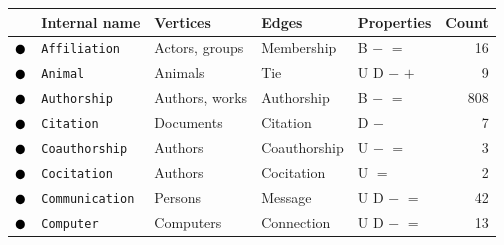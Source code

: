 \begin{tabular}{lllllr}
\toprule
& \textbf{Internal name} & \textbf{Vertices} & \textbf{Edges} & \textbf{Properties} & \textbf{Count} \\
\midrule
\textcolor{colorAffiliation}{$\newmoon$} &\texttt{Affiliation} & Actors, groups & Membership & \phantom{U} \phantom{D} B $-$ $=$ \phantom{$+$} \phantom{$\pm$} \phantom{$\stackrel{+}{=}$} \phantom{$*$} \phantom{$_*{}^*$} \phantom{$\rightleftharpoons$} \phantom{$++$}  &  16\\
\textcolor{colorAnimal}{$\newmoon$} &\texttt{Animal} & Animals & Tie & U D \phantom{B} $-$ \phantom{$=$} $+$ \phantom{$\pm$} \phantom{$\stackrel{+}{=}$} \phantom{$*$} \phantom{$_*{}^*$} \phantom{$\rightleftharpoons$} \phantom{$++$}  &  9\\
\textcolor{colorAuthorship}{$\newmoon$} &\texttt{Authorship} & Authors, works & Authorship & \phantom{U} \phantom{D} B $-$ $=$ \phantom{$+$} \phantom{$\pm$} \phantom{$\stackrel{+}{=}$} \phantom{$*$} \phantom{$_*{}^*$} \phantom{$\rightleftharpoons$} \phantom{$++$}  &  808\\
\textcolor{colorCitation}{$\newmoon$} &\texttt{Citation} & Documents & Citation & \phantom{U} D \phantom{B} $-$ \phantom{$=$} \phantom{$+$} \phantom{$\pm$} \phantom{$\stackrel{+}{=}$} \phantom{$*$} \phantom{$_*{}^*$} \phantom{$\rightleftharpoons$} \phantom{$++$}  &  7\\
\textcolor{colorCoauthorship}{$\newmoon$} &\texttt{Coauthorship} & Authors & Coauthorship & U \phantom{D} \phantom{B} $-$ $=$ \phantom{$+$} \phantom{$\pm$} \phantom{$\stackrel{+}{=}$} \phantom{$*$} \phantom{$_*{}^*$} \phantom{$\rightleftharpoons$} \phantom{$++$}  &  3\\
\textcolor{colorCocitation}{$\newmoon$} &\texttt{Cocitation} & Authors & Cocitation & U \phantom{D} \phantom{B} \phantom{$-$} $=$ \phantom{$+$} \phantom{$\pm$} \phantom{$\stackrel{+}{=}$} \phantom{$*$} \phantom{$_*{}^*$} \phantom{$\rightleftharpoons$} \phantom{$++$}  &  2\\
\textcolor{colorCommunication}{$\newmoon$} &\texttt{Communication} & Persons & Message & U D \phantom{B} $-$ $=$ \phantom{$+$} \phantom{$\pm$} \phantom{$\stackrel{+}{=}$} \phantom{$*$} \phantom{$_*{}^*$} \phantom{$\rightleftharpoons$} \phantom{$++$}  &  42\\
\textcolor{colorComputer}{$\newmoon$} &\texttt{Computer} & Computers & Connection & U D \phantom{B} $-$ $=$ \phantom{$+$} \phantom{$\pm$} \phantom{$\stackrel{+}{=}$} \phantom{$*$} \phantom{$_*{}^*$} \phantom{$\rightleftharpoons$} \phantom{$++$}  &  13\\

\end{tabular}

